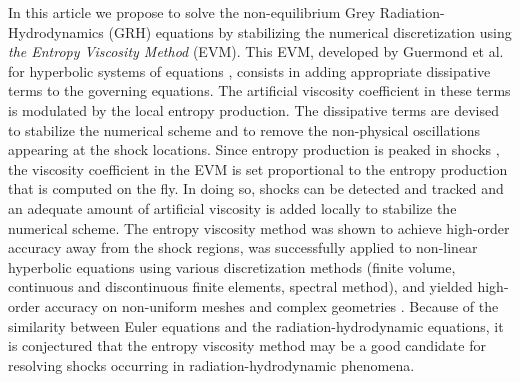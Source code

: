\documentclass[review]{elsarticle}
\begin{document}
In this article we propose to solve the non-equilibrium Grey Radiation-Hydrodynamics (GRH) equations by stabilizing the numerical discretization using \emph{the Entropy Viscosity Method} (EVM). This EVM, developed by Guermond et al. for hyperbolic systems of equations \cite{jlg1, jlg2}, consists in adding appropriate dissipative terms to the governing equations.  The artificial viscosity coefficient in these terms is modulated by the local entropy production. The dissipative terms are devised to stabilize the numerical scheme and to remove the non-physical oscillations appearing at the shock locations. Since entropy production is peaked in shocks \cite{Toro}, the  viscosity coefficient in the EVM is set proportional to the entropy production that is computed on the fly. In doing so, shocks can be detected and tracked and an adequate amount of artificial viscosity is added locally to stabilize the numerical scheme. 
The entropy viscosity method was shown to achieve high-order accuracy away from the shock regions, was successfully applied to non-linear hyperbolic equations using various discretization methods (finite volume, continuous and discontinuous finite elements, spectral method), and yielded high-order accuracy on non-uniform meshes and complex geometries \cite{jlg2, valentin}. Because of the similarity between Euler equations and the radiation-hydrodynamic equations, it is conjectured that the entropy viscosity method may be a good candidate for resolving shocks occurring in radiation-hydrodynamic phenomena.
\end{document}
